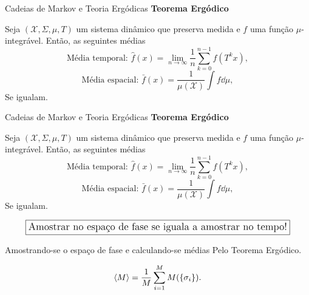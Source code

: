 \documentclass[10pt]{beamer}
\begin{document}
\begin{frame}{Cadeias de Markov e Teoria Ergódicas}
	\textbf{Teorema Ergódico}
	\begin{theorem}
		Seja $(\mathcal{X}, \Sigma, \mu, T)$ um sistema dinâmico que preserva medida e $f$ uma função $\mu$-integrável. Então, as seguintes médias
		\begin{equation*}
			\text{Média temporal: } \hat{f}(x) = \lim_{n \to \infty} \frac{1}{n} \sum_{k=0}^{n-1} f(T^k x),
		\end{equation*}
		\begin{equation*}
			\text{Média espacial: } \bar{f}(x) = \frac{1}{\mu(\mathcal{X})} \int f \dd{\mu},
		\end{equation*}
Se igualam.

	\end{theorem}
	
\end{frame}


\begin{frame}{Cadeias de Markov e Teoria Ergódicas}
	\textbf{Teorema Ergódico}
	\begin{theorem}
		Seja $(\mathcal{X}, \Sigma, \mu, T)$ um sistema dinâmico que preserva medida e $f$ uma função $\mu$-integrável. Então, as seguintes médias
		\begin{equation*}
			\text{Média temporal: } \hat{f}(x) = \lim_{n \to \infty} \frac{1}{n} \sum_{k=0}^{n-1} f(T^k x),
		\end{equation*}
		\begin{equation*}
			\text{Média espacial: } \bar{f}(x) = \frac{1}{\mu(\mathcal{X})} \int f \dd{\mu},
		\end{equation*}
Se igualam.

	\end{theorem}
	
	\begin{equation*}
		\boxed{ \text{\large Amostrar no espaço de fase se iguala a amostrar no tempo!} }
	\end{equation*}
\end{frame}

\begin{frame}{Amostrando-se o espaço de fase e calculando-se médias}
	Pelo Teorema Ergódico. 
	
	\begin{equation*}
		\ev{ M } = \frac{1}{M} \sum_{i = 1}^M M(\{ \sigma_i \}).
	\end{equation*}


\end{frame}
\end{document}
